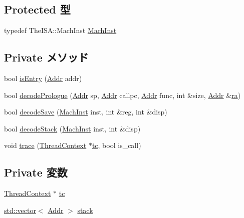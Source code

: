 \subsection*{Protected 型}
\begin{DoxyCompactItemize}
\item 
typedef TheISA::MachInst \hyperlink{classPowerISA_1_1StackTrace_a4617f528417b8f55f809ae0988284c9b}{MachInst}
\end{DoxyCompactItemize}
\subsection*{Private メソッド}
\begin{DoxyCompactItemize}
\item 
bool \hyperlink{classPowerISA_1_1StackTrace_a8c9787d05f9c0e82dfcaf31cf0fd4b50}{isEntry} (\hyperlink{base_2types_8hh_af1bb03d6a4ee096394a6749f0a169232}{Addr} addr)
\item 
bool \hyperlink{classPowerISA_1_1StackTrace_a875eea16b2891accc8cbec7eb6c36003}{decodePrologue} (\hyperlink{base_2types_8hh_af1bb03d6a4ee096394a6749f0a169232}{Addr} sp, \hyperlink{base_2types_8hh_af1bb03d6a4ee096394a6749f0a169232}{Addr} callpc, \hyperlink{base_2types_8hh_af1bb03d6a4ee096394a6749f0a169232}{Addr} func, int \&size, \hyperlink{base_2types_8hh_af1bb03d6a4ee096394a6749f0a169232}{Addr} \&\hyperlink{namespacePowerISA_acd61c92c3a3da2c22ed0c02f761bff4c}{ra})
\item 
bool \hyperlink{classPowerISA_1_1StackTrace_ae56dad5982b67d8717714c383b6a59f8}{decodeSave} (\hyperlink{classPowerISA_1_1StackTrace_a4617f528417b8f55f809ae0988284c9b}{MachInst} inst, int \&reg, int \&disp)
\item 
bool \hyperlink{classPowerISA_1_1StackTrace_a61ba7618f77dc6e62d7b0baf6273130c}{decodeStack} (\hyperlink{classPowerISA_1_1StackTrace_a4617f528417b8f55f809ae0988284c9b}{MachInst} inst, int \&disp)
\item 
void \hyperlink{classPowerISA_1_1StackTrace_a46d6b95a2e5fdb75702cf45e39566645}{trace} (\hyperlink{classThreadContext}{ThreadContext} $\ast$\hyperlink{classPowerISA_1_1StackTrace_a4455a4759e69e5ebe68ae7298cbcc37d}{tc}, bool is\_\-call)
\end{DoxyCompactItemize}
\subsection*{Private 変数}
\begin{DoxyCompactItemize}
\item 
\hyperlink{classThreadContext}{ThreadContext} $\ast$ \hyperlink{classPowerISA_1_1StackTrace_a4455a4759e69e5ebe68ae7298cbcc37d}{tc}
\item 
\hyperlink{classstd_1_1vector}{std::vector}$<$ \hyperlink{base_2types_8hh_af1bb03d6a4ee096394a6749f0a169232}{Addr} $>$ \hyperlink{classPowerISA_1_1StackTrace_a8be39169db4f31c77f5188de23c602f1}{stack}
\end{DoxyCompactItemize}


